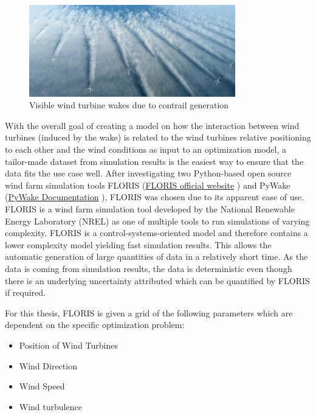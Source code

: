 \begin{figure}[h] 
	\centering
	\includegraphics[width=0.8\textwidth]{../figures/introduction/wake_photo.png} 
	\caption{Visible wind turbine wakes due to contrail generation \cite{windpowermonthly_offshore_clusters}}
	\label{fig:wake_photo}
\end{figure}


With the overall goal of creating a model on how the interaction between wind turbines (induced by the wake) is related to the wind turbines relative positioning to each other and the wind conditions as input to an optimization model, a tailor-made dataset from simulation results is the easiest way to ensure that the data fits the use case well. After investigating two Python-based open source wind farm simulation tools FLORIS (\href{https://www.nrel.gov/wind/floris}{FLORIS official website} \cite{nrel_floris_web}) and PyWake (\href{https://topfarm.pages.windenergy.dtu.dk/PyWake/}{PyWake Documentation} \cite{dtu_pywake_2025}), FLORIS was chosen due to its apparent ease of use. FLORIS is a wind farm simulation tool developed by the National Renewable Energy Laboratory (NREL) as one of multiple tools to run simulations of varying complexity. FLORIS is a control-systems-oriented model and therefore contains a lower complexity model yielding fast simulation results. This allows the automatic generation of large quantities of data in a relatively short time. As the data is coming from  simulation results, the data is deterministic even though there is an underlying uncertainty attributed which can be quantified by FLORIS if required. 

For this thesis, FLORIS is given a grid of the following parameters which are dependent on the specific optimization problem:

\begin{itemize}
	\item Position of Wind Turbines
	\item Wind Direction
	\item Wind Speed
	\item Wind turbulence
\end{itemize}

